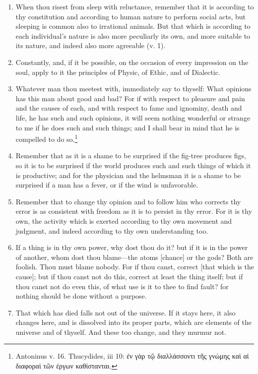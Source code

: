\begin{enumerate}
\item When thou risest from sleep with reluctance, remember that it is according to thy constitution and according to human nature to perform social acts, but sleeping is common also to irrational animals. But that which is according to each individual's nature is also more peculiarly its own, and more suitable to its nature, and indeed also more agreeable (v. 1).

\item Constantly, and, if it be possible, on the occasion of every impression on the soul, apply to it the principles of Physic, of Ethic, and of Dialectic.

\item Whatever man thou meetest with, immediately say to thyself: What opinions has this man about good and bad? For if with respect to pleasure and pain and the causes of each, and with respect to fame and ignominy, death and life, he has such and such opinions, it will seem nothing wonderful or strange to me if he does such and such things; and I shall bear in mind that he is compelled to do so.\footnote{Antoninus v. 16. Thucydides, iii 10: \textgreek{ἐν γὰρ τᾤ διαλλάσσοντι τῆς γνώμης καὶ αἱ διαφοραὶ τῶν ἐργων καθίστανται}.}

\item Remember that as it is a shame to be surprised if the fig-tree produces figs, so it is to be surprised if the world produces such and such things of which it is productive; and for the physician and the helmsman it is a shame to be surprised if a man has a fever, or if the wind is unfavorable.

\item Remember that to change thy opinion and to follow him who corrects thy error is as consistent with freedom as it is to persist in thy error. For it is thy own, the activity which is exerted according to thy own movement and judgment, and indeed according to thy own understanding too.

\item If a thing is in thy own power, why dost thou do it? but if it is in the power of another, whom dost thou blame—the atoms [{\clarify chance}] or the gods? Both are foolish. Thou must blame nobody. For if thou canst, correct [{\clarify that which is the cause}]; but if thou canst not do this, correct at least the thing itself; but if thou canst not do even this, of what use is it to thee to find fault? for nothing should be done without a purpose.

\item That which has died falls not out of the universe. If it stays here, it also changes here, and is dissolved into its proper parts, which are elements of the universe and of thyself. And these too change, and they murmur not.


\end{enumerate}
